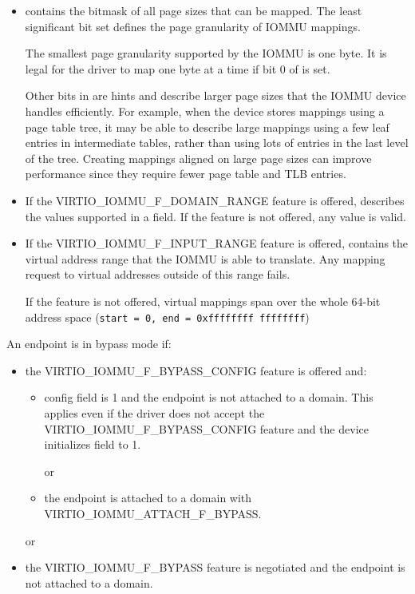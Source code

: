 \begin{itemize}
\item {} contains the bitmask of all page sizes that
  can be mapped. The least significant bit set defines the page
  granularity of IOMMU mappings.

  The smallest page granularity supported by the IOMMU is one byte. It is
  legal for the driver to map one byte at a time if bit 0 of
   is set.

  Other bits in  are hints and describe larger page
  sizes that the IOMMU device handles efficiently. For example, when the
  device stores mappings using a page table tree, it may be able to
  describe large mappings using a few leaf entries in intermediate tables,
  rather than using lots of entries in the last level of the tree.
  Creating mappings aligned on large page sizes can improve performance
  since they require fewer page table and TLB entries.

\item If the VIRTIO_IOMMU_F_DOMAIN_RANGE feature is offered,
   describes the values supported in a 
  field. If the feature is not offered, any  value is valid.

\item If the VIRTIO_IOMMU_F_INPUT_RANGE feature is offered,
   contains the virtual address range that the IOMMU is
  able to translate. Any mapping request to virtual addresses outside of
  this range fails.

  If the feature is not offered, virtual mappings span over the whole
  64-bit address space (\texttt{start = 0, end = 0xffffffff ffffffff})
\end{itemize}

An endpoint is in bypass mode if:
\begin{itemize}
  \item the VIRTIO_IOMMU_F_BYPASS_CONFIG feature is offered and:
    \begin{itemize}
      \item config field  is 1 and the endpoint is
        not attached to a domain. This applies even if the driver
        does not accept the VIRTIO_IOMMU_F_BYPASS_CONFIG feature
        and the device initializes field  to 1.

        or
      \item the endpoint is attached to a domain with
        VIRTIO_IOMMU_ATTACH_F_BYPASS.
    \end{itemize}
  or
  \item the VIRTIO_IOMMU_F_BYPASS feature is negotiated and the
    endpoint is not attached to a domain.
\end{itemize}

